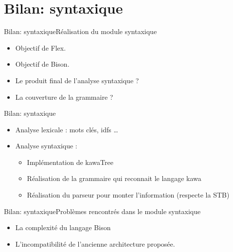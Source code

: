 \section{Bilan: syntaxique}
    \begin{frame}{Bilan: syntaxique}{Réalisation du module syntaxique}
    	
	      \begin{itemize}
	      	\item<1-> Objectif de Flex.
			\item<2-> Objectif de Bison.
			\item<3-> Le produit final de l'analyse syntaxique ?
			\item<4-> La couverture de la grammaire ?
	      \end{itemize}
    	
    \end{frame}

    \begin{frame}{Bilan: syntaxique}
    	
	      \begin{itemize}
	      	\item<1-> Analyse lexicale : mots clés, idfs …
			\item<2-> Analyse syntaxique :
			\begin{itemize}
				\item<3-> Implémentation de kawaTree
				\item<4-> Réalisation de la grammaire qui reconnait le langage kawa
				\item<5-> Réalisation du parseur pour monter l’information (respecte la STB)
			\end{itemize}
	      \end{itemize}
    	
    \end{frame}

    \begin{frame}{Bilan: syntaxique}{Problèmes rencontrés dans le module syntaxique}
    	
	      \begin{itemize}
	      	\item<1-> La complexité du langage Bison
			\item<2-> L’incompatibilité de l’ancienne architecture proposée.
	      \end{itemize}
    	
    \end{frame}

  
    
